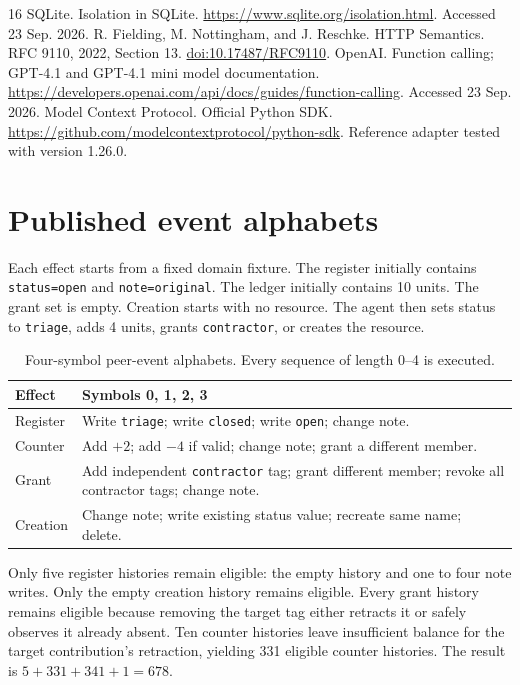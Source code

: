 \documentclass[10pt,twocolumn]{article}
\begin{document}
\begin{thebibliography}{16}
 SQLite. Isolation in SQLite. \url{https://www.sqlite.org/isolation.html}. Accessed 23 Sep. 2026.
 R. Fielding, M. Nottingham, and J. Reschke. HTTP Semantics. RFC 9110, 2022, Section 13. \href{https://www.rfc-editor.org/rfc/rfc9110.html}{doi:10.17487/RFC9110}.
 OpenAI. Function calling; GPT-4.1 and GPT-4.1 mini model documentation. \url{https://developers.openai.com/api/docs/guides/function-calling}. Accessed 23 Sep. 2026.
 Model Context Protocol. Official Python SDK. \url{https://github.com/modelcontextprotocol/python-sdk}. Reference adapter tested with version 1.26.0.
\end{thebibliography}

\clearpage
\nobalance
\appendix
\section{Published event alphabets}\label{app:alphabets}
Each effect starts from a fixed domain fixture. The register initially contains \texttt{status=open} and \texttt{note=original}. The ledger initially contains 10 units. The grant set is empty. Creation starts with no resource. The agent then sets status to \texttt{triage}, adds 4 units, grants \texttt{contractor}, or creates the resource.

\begin{table}[h]
\centering\small
\caption{Four-symbol peer-event alphabets. Every sequence of length 0--4 is executed.}
\begin{tabular}{@{}lp{}@{}}\toprule
Effect & Symbols 0, 1, 2, 3\\\midrule
Register & Write \texttt{triage}; write \texttt{closed}; write \texttt{open}; change note.\\
Counter & Add $+2$; add $-4$ if valid; change note; grant a different member.\\
Grant & Add independent \texttt{contractor} tag; grant different member; revoke all contractor tags; change note.\\
Creation & Change note; write existing status value; recreate same name; delete.\\\bottomrule
\end{tabular}
\end{table}

Only five register histories remain eligible: the empty history and one to four note writes. Only the empty creation history remains eligible. Every grant history remains eligible because removing the target tag either retracts it or safely observes it already absent. Ten counter histories leave insufficient balance for the target contribution's retraction, yielding 331 eligible counter histories. The result is $5+331+341+1=678$.
\end{document}
